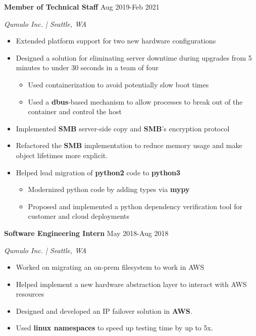 \documentclass[paper=a4,fontsize=11pt]{scrartcl} %
\newcommand{\EducationEntry}[4]{
		\noindent \textbf{#1}     %
			\hfill#2 \par  %
		\noindent \textit{#3} \par        %
		\noindent\hangafter=0 \small #4 %
		\normalsize \par}
\begin{document}
\EducationEntry{Member of Technical Staff}{Aug 2019-Feb 2021}{Qumulo Inc. | Seattle, WA}{
\begin{itemize}
  \item Extended platform support for two new hardware configurations
  \item Designed a solution for eliminating server downtime during upgrades from 5 minutes to under 30 seconds in a team of four
    \begin{itemize}
        \item Used containerization to avoid potentially slow boot times
        \item Used a \textbf{dbus}-based mechanism to allow processes to break out of the container and control the host
    \end{itemize}
  \item Implemented \textbf{SMB} server-side copy and \textbf{SMB}'s encryption protocol
  \item Refactored the \textbf{SMB} implementation to reduce memory usage and make object lifetimes more explicit.
  \item Helped lead migration of \textbf{python2} code to \textbf{python3}
    \begin{itemize}
      \item Modernized python code by adding types via \textbf{mypy}
      \item Proposed and implemented a python dependency verification tool for customer and cloud deployments
    \end{itemize}
\end{itemize}
}

\EducationEntry{Software Engineering Intern}{May 2018-Aug 2018}{Qumulo Inc. | Seattle, WA}{
\begin{itemize}
  \item Worked on migrating an on-prem filesystem to work in AWS
  \item Helped implement a new hardware abstraction layer to interact with AWS resources
  \item Designed and developed an IP failover solution in \textbf{AWS}.
  \item Used \textbf{linux namespaces} to speed up testing time by up to 5x.
\end{itemize}
}
\end{document}

